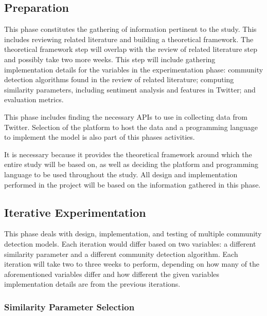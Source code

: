 \subsection{Preparation}




This phase constitutes the gathering of information pertinent to the study. This includes reviewing related literature and building a theoretical framework. The theoretical framework step will overlap with the review of related literature step and possibly take two more weeks. This step will include gathering implementation details for the variables in the experimentation phase: community detection algorithms found in the review of related literature; computing similarity parameters, including sentiment analysis and features in Twitter; and evaluation metrics. 




This phase includes finding the necessary API\vtick s to use in collecting data from Twitter. Selection of the platform to host the data and a programming language to implement the model is also part of this phase\vtick s activities. 




It is necessary because it provides the theoretical framework around which the entire study will be based on, as well as deciding the platform and programming language to be used throughout the study. All design and implementation performed in the project will be based on the information gathered in this phase.




\subsection{Iterative Experimentation}




This phase deals with design, implementation, and testing of multiple community detection models. Each iteration would differ based on two variables: a different similarity parameter and a different community detection algorithm. Each iteration will take two to three weeks to perform, depending on how many of the aforementioned variables differ and how different the given variable\vtick s implementation details are from the previous iteration\vtick s.




\subsubsection{Similarity Parameter Selection}





